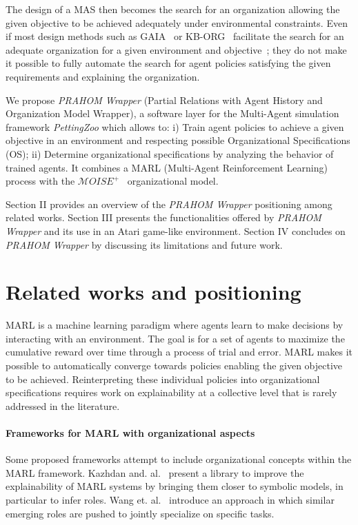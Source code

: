\documentclass[doubleblind]{ecai}
\begin{document}
The design of a MAS then becomes the search for an organization allowing the given objective to be achieved adequately under environmental constraints.
Even if most design methods such as GAIA~\cite{Cernuzzi2014} or KB-ORG~\cite{Sims2008} facilitate the search for an adequate organization for a given environment and objective~\cite{Mefteh2013}; they do not make it possible to fully automate the search for agent policies satisfying the given requirements and explaining the organization.

We propose \emph{PRAHOM Wrapper} (Partial Relations with Agent History and Organization Model Wrapper), a software layer for the Multi-Agent simulation framework \emph{PettingZoo} which allows to:
%
i) Train agent policies to achieve a given objective in an environment and respecting possible Organizational Specifications (OS);\quad
ii) Determine organizational specifications %
by analyzing the behavior of trained agents.
%
It combines a MARL (Multi-Agent Reinforcement Learning) process with the $\mathcal{M}OISE^+$~\cite{Hubner2007} organizational model.

Section II provides an overview of the \emph{PRAHOM Wrapper} positioning among related works.
Section III presents the functionalities offered by \emph{PRAHOM Wrapper} and its use in an Atari game-like environment.
Section IV concludes on \emph{PRAHOM Wrapper} by discussing its limitations and future work.



\section{Related works and positioning}

MARL is a machine learning paradigm where agents learn to make decisions by interacting with an environment. The goal is for a set of agents to maximize the cumulative reward over time through a process of trial and error.
MARL makes it possible to automatically converge towards policies enabling the given objective to be achieved. Reinterpreting these individual policies into organizational specifications requires work on explainability at a collective level that is rarely addressed in the literature.

\paragraph{\textbf{Frameworks for MARL with organizational aspects}}
%
Some proposed frameworks attempt to include organizational concepts within the MARL framework.
Kazhdan and. al.~\cite{Kazhdan2020} present a library to improve the explainability of MARL systems by bringing them closer to symbolic models, in particular to infer roles.%
%
Wang et. al.~\cite{Wang2020} introduce an approach in which similar emerging roles are pushed to jointly specialize on specific tasks.
\end{document}
